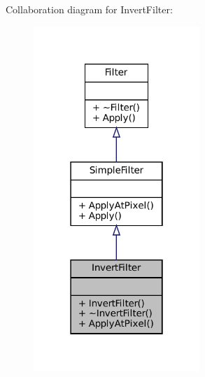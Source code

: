 Collaboration diagram for Invert\+Filter\+:\nopagebreak
\begin{figure}[H]
\begin{center}
\leavevmode
\includegraphics[width=178pt]{classInvertFilter__coll__graph}
\end{center}
\end{figure}
